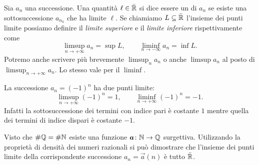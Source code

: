 \begin{definition}
Sia $a_n$ una successione.
Una quantità $\ell\in \bar{\mathbb R}$ si dice essere
un  di $a_n$ se esiste una sottosuccessione
$a_{n_k}$ che ha limite $\ell$. Se chiamiamo $L\subseteq \bar{\mathbb R}$ l'insieme
dei punti limite possiamo definire il \emph{limite superiore} e il
\emph{limite inferiore}
rispettivamente come
\[
\limsup_{n\to +\infty} a_n = \sup L, \qquad
\liminf_{n\to -\infty} a_n = \inf L.
\]
Potremo anche scrivere più brevemente $\limsup_n a_n$ o anche $\limsup a_n$
al posto di $\displaystyle \limsup_{n\to +\infty} a_n$.
Lo stesso vale per il $\liminf$.
\end{definition}

\begin{example}
La successione $a_n=(-1)^n$ ha due punti limite:
\[
  \limsup_{n\to +\infty}(-1)^n = 1, \qquad \liminf_{n\to+\infty} (-1)^n = -1.
\]
Infatti la sottosuccessione dei termini con indice pari è costante $1$ mentre
quella dei termini di indice dispari è costante $-1$.
\end{example}
%
\begin{example}
  Visto che $\#\mathbb Q=\#\mathbb N$ esiste una funzione $\boldsymbol a \colon \mathbb N \to \mathbb Q$
  surgettiva. Utilizzando la proprietà di densità dei numeri razionali
  si può dimostrare che l'insieme dei punti limite della corrispondente successione
  $a_n = \vec a(n)$ è tutto $\bar {\mathbb R}$.
\end{example}
%
